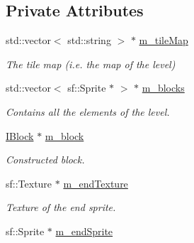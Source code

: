\subsection*{Private Attributes}
\begin{DoxyCompactItemize}
\item 
\hypertarget{class_level_one_a88e550c3f03ca3fd24c0686947daa7a7}{std\-::vector$<$ std\-::string $>$ $\ast$ \hyperlink{class_level_one_a88e550c3f03ca3fd24c0686947daa7a7}{m\-\_\-tile\-Map}}\label{class_level_one_a88e550c3f03ca3fd24c0686947daa7a7}

\begin{DoxyCompactList}\small\item\em The tile map (i.\-e. the map of the level) \end{DoxyCompactList}\item 
\hypertarget{class_level_one_aaf2e67751b769f03f69d8ea8d72812db}{std\-::vector$<$ sf\-::\-Sprite $\ast$ $>$ $\ast$ \hyperlink{class_level_one_aaf2e67751b769f03f69d8ea8d72812db}{m\-\_\-blocks}}\label{class_level_one_aaf2e67751b769f03f69d8ea8d72812db}

\begin{DoxyCompactList}\small\item\em Contains all the elements of the level. \end{DoxyCompactList}\item 
\hypertarget{class_level_one_a4a746a2634f4ac7537c78cf48923325b}{\hyperlink{class_i_block}{I\-Block} $\ast$ \hyperlink{class_level_one_a4a746a2634f4ac7537c78cf48923325b}{m\-\_\-block}}\label{class_level_one_a4a746a2634f4ac7537c78cf48923325b}

\begin{DoxyCompactList}\small\item\em Constructed block. \end{DoxyCompactList}\item 
\hypertarget{class_level_one_a7fb405f524555f62aac2573401345e28}{sf\-::\-Texture $\ast$ \hyperlink{class_level_one_a7fb405f524555f62aac2573401345e28}{m\-\_\-end\-Texture}}\label{class_level_one_a7fb405f524555f62aac2573401345e28}

\begin{DoxyCompactList}\small\item\em Texture of the end sprite. \end{DoxyCompactList}\item 
\hypertarget{class_level_one_a761f983cfe6814e012134e5434535682}{sf\-::\-Sprite $\ast$ \hyperlink{class_level_one_a761f983cfe6814e012134e5434535682}{m\-\_\-end\-Sprite}}\label{class_level_one_a761f983cfe6814e012134e5434535682}


\end{DoxyCompactItemize}

